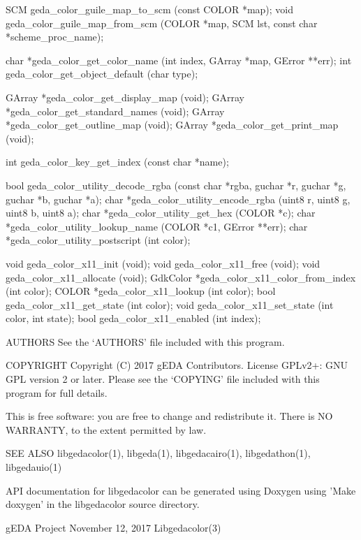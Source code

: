                         SCM     geda_color_guile_map_to_scm      (const  COLOR
              *map);
                       void     geda_color_guile_map_from_scm    (COLOR  *map,
              SCM lst, const char *scheme_proc_name);

                       char    *geda_color_get_color_name        (int   index,
              GArray *map, GError **err);
                        int    geda_color_get_object_default   (char type);

                     GArray   *geda_color_get_display_map      (void);
                     GArray   *geda_color_get_standard_names   (void);
                     GArray   *geda_color_get_outline_map      (void);
                     GArray   *geda_color_get_print_map        (void);

                        int      geda_color_key_get_index         (const  char
              *name);

                       bool     geda_color_utility_decode_rgba   (const   char
              *rgba, guchar *r, guchar *g, guchar *b, guchar *a);
                       char   *geda_color_utility_encode_rgba  (uint8 r, uint8
              g, uint8 b, uint8 a);
                       char   *geda_color_utility_get_hex      (COLOR *c);
                       char    *geda_color_utility_lookup_name   (COLOR   *c1,
              GError **err);
                       char   *geda_color_utility_postscript   (int color);

                       void    geda_color_x11_init             (void);
                       void    geda_color_x11_free             (void);
                       void    geda_color_x11_allocate         (void);
                   GdkColor   *geda_color_x11_color_from_index (int color);
                      COLOR   *geda_color_x11_lookup           (int color);
                       bool    geda_color_x11_get_state        (int color);
                       void    geda_color_x11_set_state        (int color, int
              state);
                       bool    geda_color_x11_enabled          (int index);


AUTHORS
       See the `AUTHORS' file included with this program.


COPYRIGHT
       Copyright (C) 2017 gEDA Contributors. License GPLv2+: GNU GPL
       version 2 or later. Please see the `COPYING' file included with this
       program for full details.

       This is free software: you are free to change and redistribute it.
       There is NO WARRANTY, to the extent permitted by law.


SEE ALSO
       libgedacolor(1),    libgeda(1),    libgedacairo(1),     libgedathon(1),
       libgedauio(1)

       API documentation for libgedacolor can be generated using Doxygen using
       'Make doxygen' in the libgedacolor source directory.



gEDA Project                   November 12, 2017               Libgedacolor(3)
